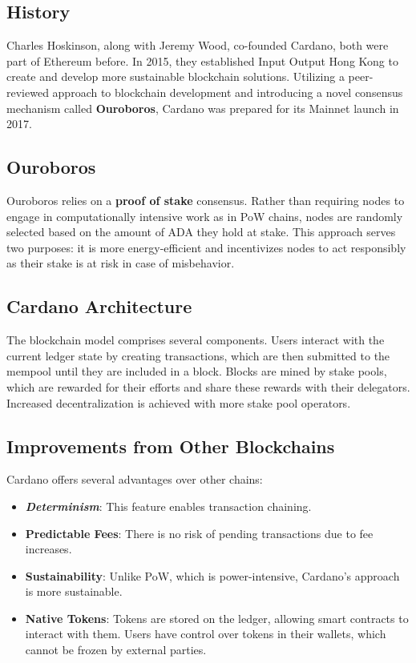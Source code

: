 \subsection{History} \label{sec:overview}

Charles Hoskinson, along with Jeremy Wood, co-founded Cardano, both were part of Ethereum before. In 2015, they established Input Output Hong Kong to create and develop more sustainable blockchain solutions. Utilizing a peer-reviewed approach to blockchain development and introducing a novel consensus mechanism called \textbf{Ouroboros}, Cardano was prepared for its Mainnet launch in 2017.

\subsection{Ouroboros}

Ouroboros relies on a \textbf{proof of stake} consensus. Rather than requiring nodes to engage in computationally intensive work as in PoW chains, nodes are randomly selected based on the amount of ADA they hold at stake. This approach serves two purposes: it is more energy-efficient and incentivizes nodes to act responsibly as their stake is at risk in case of misbehavior.

\subsection{Cardano Architecture}

The blockchain model comprises several components. Users interact with the current ledger state by creating transactions, which are then submitted to the mempool until they are included in a block. Blocks are mined by stake pools, which are rewarded for their efforts and share these rewards with their delegators. Increased decentralization is achieved with more stake pool operators.
\subsection{Improvements from Other Blockchains}

Cardano offers several advantages over other chains:

\begin{itemize}
  \item \textbf{\textit{\gls{Determinism}}}: This feature enables transaction chaining.
  \item \textbf{Predictable Fees}: There is no risk of pending transactions due to fee increases.
  \item \textbf{Sustainability}: Unlike PoW, which is power-intensive, Cardano's approach is more sustainable.
  \item \textbf{Native Tokens}: Tokens are stored on the ledger, allowing smart contracts to interact with them. Users have control over tokens in their wallets, which cannot be frozen by external parties.
\end{itemize}

